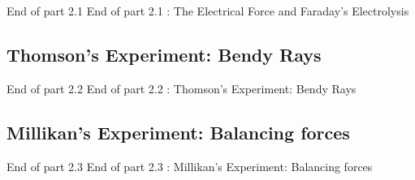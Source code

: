  \begin{frame}{End of part 2.1}
End of part 2.1 : The Electrical Force and Faraday's Electrolysis\\[1ex]

\end{frame}



\subsection{Thomson's Experiment: Bendy Rays}




\begin{frame}{}
\small

\end{frame}


 \begin{frame}{End of part 2.2}
End of part 2.2 : Thomson's Experiment: Bendy Rays\\[1ex]

\end{frame}



\subsection{Millikan's Experiment: Balancing forces}





\begin{frame}{}
\small

\end{frame}


 \begin{frame}{End of part 2.3}
End of part 2.3 : Millikan's Experiment: Balancing forces\\[1ex]

\end{frame}



 
